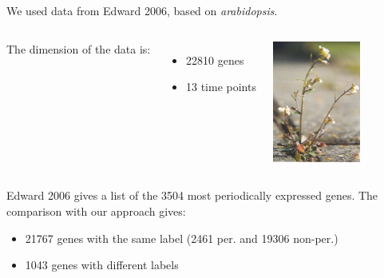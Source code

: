 \documentclass{beamer}
\begin{document}
\begin{frame}{}
\vspace{0.5cm}
We used data from Edward 2006, based on \textit{arabidopsis}.
\begin{columns}[c]
\column{5cm}
The dimension of the data is:
\begin{itemize}
 \item 22810 genes
 \item 13 time points
\end{itemize}
\column{5cm}
\begin{center}
 \includegraphics[height=4cm]{figures/Arabidopsis}
\end{center}
\end{columns}
\begin{block}{}
 Edward 2006 gives a list of the 3504 most periodically expressed genes. The comparison with our approach gives:
 \begin{itemize}
 \item 21767 genes with the same label (2461 per. and 19306 non-per.)
 \item 1043 genes with different labels
\end{itemize}
\end{block}
\end{frame}
\end{document}
